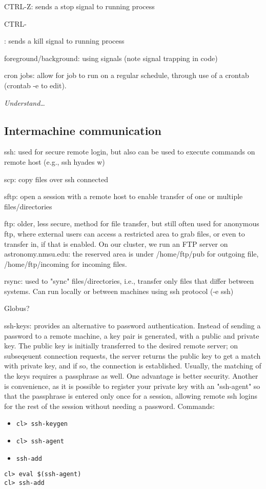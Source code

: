 \documentclass{article}
\newcommand{\test}[1]{%
    \begin{center}
        \colorbox{hl}{\parbox{0.9\textwidth}{\emph{\centering #1}}}
    \end{center}}
\begin{document}
CTRL-Z: sends a stop signal to running process

CTRL-

: sends a kill signal to running process

foreground/background: using signals (note signal trapping in code)

cron jobs: allow for job to run on a regular schedule, through use of
a crontab (crontab -e to edit).

\test{Understand\ldots}

\subsection{Intermachine communication}
ssh: used for secure remote login, but also can be used to execute
commands on remote host (e.g., ssh hyades w)

scp: copy files over ssh connected

sftp: open a session with a remote host to enable transfer of one or
multiple files/directories

ftp: older, less secure, method for file transfer, but still often
used for anonymous ftp, where external users can access a restricted
area to grab files, or even to transfer in, if that is enabled. On our
cluster, we run an FTP server on astronomy.nmsu.edu: the reserved area
is under /home/ftp/pub for outgoing file, /home/ftp/incoming for
incoming files.

rsync: used to "sync" files/directories, i.e., transfer only files
that differ between systems. Can run locally or between machines using
ssh protocol (-e ssh)

Globus?

ssh-keys: provides an alternative to password authentication. Instead
of sending a password to a remote machine, a key pair is generated,
with a public and private key. The public key is initially transferred
to the desired remote server; on subseqeuent connection requests, the
server returns the public key to get a match with private key, and if
so, the connection is established. Usually, the matching of the keys
requires a passphrase as well. One advantage is better security.
Another is convenience, as it is possible to register your private key
with an "ssh-agent" so that the passphrase is entered only once for a
session, allowing remote ssh logins for the rest of the session
without needing a password. Commands:

\begin{itemize}
    \item \verb|cl> ssh-keygen|
    \item \verb|cl> ssh-agent|
    \item \verb|ssh-add|
\end{itemize}
\begin{verbatim}
cl> eval $(ssh-agent)
cl> ssh-add
\end{verbatim}
\end{document}
